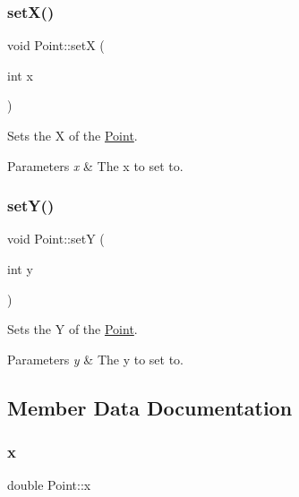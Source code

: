 \subsubsection{\texorpdfstring{setX()}{setX()}}
{\footnotesize\ttfamily void Point\+::setX (\begin{DoxyParamCaption}\item[{int}]{x }\end{DoxyParamCaption})}



Sets the X of the \mbox{\hyperlink{class_point}{Point}}. 


\begin{DoxyParams}{Parameters}
{\em x} & The x to set to. \\
\hline
\end{DoxyParams}
\mbox{\label{class_point_afccad787a359f062efc1af5e935a99ba}} 
\subsubsection{\texorpdfstring{setY()}{setY()}}
{\footnotesize\ttfamily void Point\+::setY (\begin{DoxyParamCaption}\item[{int}]{y }\end{DoxyParamCaption})}



Sets the Y of the \mbox{\hyperlink{class_point}{Point}}. 


\begin{DoxyParams}{Parameters}
{\em y} & The y to set to. \\
\hline
\end{DoxyParams}


\subsection{Member Data Documentation}
\mbox{\label{class_point_ab99c56589bc8ad5fa5071387110a5bc7}} 
\subsubsection{\texorpdfstring{x}{x}}
{\footnotesize\ttfamily double Point\+::x}

\mbox{\label{class_point_afa38be143ae800e6ad69ce8ed4df62d8}} 
